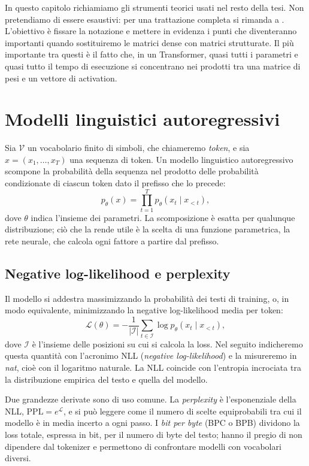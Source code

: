 In questo capitolo richiamiamo gli strumenti teorici usati nel resto della tesi. Non pretendiamo di essere esaustivi: per una trattazione completa si rimanda a \cite{goodfellow2016deep}. L'obiettivo è fissare la notazione e mettere in evidenza i punti che diventeranno importanti quando sostituiremo le matrici dense con matrici strutturate. Il più importante tra questi è il fatto che, in un Transformer, quasi tutti i parametri e quasi tutto il tempo di esecuzione si concentrano nei prodotti tra una matrice di pesi e un vettore di activation.

\section{Modelli linguistici autoregressivi}

Sia $\mathcal{V}$ un vocabolario finito di simboli, che chiameremo \emph{token}, e sia $x=(x_1,\dots,x_T)$ una sequenza di token. Un modello linguistico autoregressivo scompone la probabilità della sequenza nel prodotto delle probabilità condizionate di ciascun token dato il prefisso che lo precede:
\begin{equation}
p_\theta(x) = \prod_{t=1}^{T} p_\theta(x_t \mid x_{<t}),
\end{equation}
dove $\theta$ indica l'insieme dei parametri. La scomposizione è esatta per qualunque distribuzione; ciò che la rende utile è la scelta di una funzione parametrica, la rete neurale, che calcola ogni fattore a partire dal prefisso.

\subsection{Negative log-likelihood e perplexity}

Il modello si addestra massimizzando la probabilità dei testi di training, o, in modo equivalente, minimizzando la negative log-likelihood media per token:
\begin{equation}
\mathcal{L}(\theta) = -\frac{1}{|\mathcal{I}|}\sum_{t\in\mathcal{I}} \log p_\theta(x_{t}\mid x_{<t}),
\label{eq:nll}
\end{equation}
dove $\mathcal{I}$ è l'insieme delle posizioni su cui si calcola la loss. Nel seguito indicheremo questa quantità con l'acronimo NLL (\emph{negative log-likelihood}) e la misureremo in \emph{nat}, cioè con il logaritmo naturale. La NLL coincide con l'entropia incrociata tra la distribuzione empirica del testo e quella del modello.

Due grandezze derivate sono di uso comune. La \emph{perplexity} è l'esponenziale della NLL, $\mathrm{PPL}=e^{\mathcal{L}}$, e si può leggere come il numero di scelte equiprobabili tra cui il modello è in media incerto a ogni passo. I \emph{bit per byte} (BPC o BPB) dividono la loss totale, espressa in bit, per il numero di byte del testo; hanno il pregio di non dipendere dal tokenizer e permettono di confrontare modelli con vocabolari diversi.

